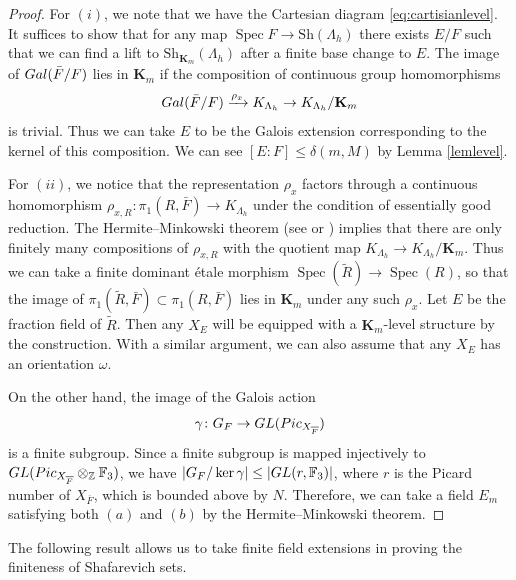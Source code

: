\documentclass[11pt,reqno,oneside]{amsart}
\numberwithin{equation}{section}
\theoremstyle{definition}
\DeclareMathOperator{\Spec}{Spec}
\newcommand{\Pic}{{\rm Pic}}
\newcommand{\Gal}{{\rm Gal}}
\newcommand{\GL}{{\rm GL}}
\newcommand{\Sh}{\mathrm{Sh}}
\newcommand{\ZZ}{\mathbb{Z}}
\begin{document}
\begin{proof}
For $(i)$, we note that we have the Cartesian diagram \eqref{eq:cartisianlevel}.
It suffices to show that  for any  map $\Spec F\to \Sh(\Lambda_h)$ there exists $E/F$ such that we can find a lift to $\Sh_{\mathbf{K}_{m}}(\Lambda_h)$ after a finite base change to $E$. The image of $\Gal(\bar{F}/F)$ lies in $\mathbf{K}_m$ if the composition of continuous group homomorphisms 
\[
\Gal(\bar{F}/F) \xrightarrow{\rho_x} K_{\Lambda_h} \to K_{\Lambda_h}/\mathbf{K}_m
\]
is trivial.  Thus we can take $E$ to be the Galois extension corresponding to the kernel of this composition. We can see $[E:F] \leq \delta(m,M)$ by Lemma \ref{lemlevel}.

For $(ii)$, we notice that the representation $\rho_x$ factors through a continuous homomorphism $\rho_{x,R} \colon \pi_1(R, \bar{F}) \to K_{\Lambda_h}$ under the condition of essentially good reduction. The Hermite–Minkowski theorem (see \cite[Chap. VI, Sect. 2]{Faltings1992} or \cite[Proposition 2.3, Theorem 2.9]{Harada2009}) implies that there are only finitely many compositions of $\rho_{x,R}$ with the quotient map $K_{\Lambda_h} \to K_{\Lambda_h}/\mathbf{K}_m$. Thus we can take a finite dominant \'etale morphism $\Spec(\widetilde{R}) \to \Spec(R)$, so that the image of $\pi_1(\widetilde{R},\bar{F}) \subset \pi_1(R,\bar{F})$ lies in $\mathbf{K}_m$ under any such $\rho_x$.
Let $E$ be the fraction field of $\widetilde{R}$. Then any $X_E$ will be equipped with a $\mathbf{K}_m$-level structure by the construction. With a similar argument, we can also assume that any $X_E$ has an orientation $\omega$.

On the other hand,
the image of the Galois action
\[
\gamma \colon G_{F} \rightarrow \GL (\Pic_{X_{\overline{F}}})
\]
is a finite subgroup.
Since a finite subgroup is mapped injectively to $\GL(\Pic_{X_{\overline{F}}}\otimes_{\ZZ}\mathbb{F}_{3})$, we have $|G_{F}/\ker \gamma| \leq |\GL(r,\mathbb{F}_{3})|$, where $r$ is the Picard number of $X_{\overline{F}}$, which is bounded above by $N$.
Therefore, we can  take a field $E_m$ satisfying both $(a)$ and $(b)$ by the Hermite–Minkowski theorem.
\end{proof}



The following result allows us to take finite field extensions in proving the finiteness of Shafarevich sets. 
\end{document}
